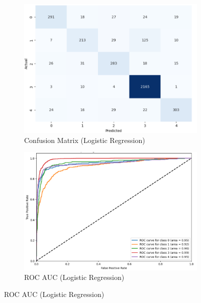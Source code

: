 \begin{figure}[h!]
    \centering
    \begin{subfigure}[b]{0.49\textwidth}
        \centering
        \includegraphics[width=\textwidth]{Images/LR Confusion Matrix.png}
        \caption*{Confusion Matrix (Logistic Regression)}
        \label{LRCM}  %
    \end{subfigure}
    \hfill
    \begin{subfigure}[b]{0.49\textwidth}
        \centering
        \includegraphics[width=\textwidth]{Images/LR ROC.png}
        \caption*{ROC AUC (Logistic Regression)}
        \label{LRROC}  %
    \end{subfigure}
    \label{fig:comparison}
\end{figure}

